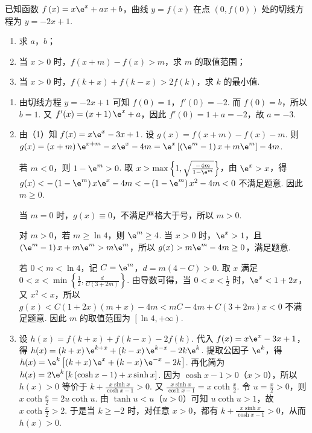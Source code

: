 \documentclass[UTF8,a4paper,oneside,11pt]{ctexbook}
\begin{document}
\begin{problem}
已知函数 \(f\left( x \right)=x\e^x+ax+b\)，曲线 \(y=f\left( x \right)\) 在点 \(\left( 0,f\left( 0 \right) \right)\) 处的切线方程为 \(y=-2x+1\).

\begin{enumerate}
\item 求 \(a\)，\(b\)；
\item 当 \(x>0\) 时，\(f\left( x+m \right)-f\left( x \right)>m\)，求 \(m\) 的取值范围；
\item 当 \(x>0\) 时，\(f\left( k+x \right)+f\left( k-x \right)>2f\left( k \right)\)，求 \(k\) 的最小值.
\end{enumerate}
\end{problem}

\begin{solution}
\begin{enumerate}
\item 由切线方程 \(y=-2x+1\) 可知 \(f(0)=1\)，\(f'(0)=-2\). 而 \(f(0)=b\)，所以 \(b=1\).
又 \(f'(x)=\left( x+1 \right)\e^x+a\)，因此 \(f'(0)=1+a=-2\)，故 \(a=-3\).

\item 由（1）知 \(f(x)=x\e^x-3x+1\). 设 \(g(x)=f\left( x+m \right)-f(x)-m\). 则 \(g(x)=\left( x+m \right)\e^{x+m}-x\e^x-4m=\e^x\left[ \left( \e^m-1 \right)x+m\e^m \right]-4m\).

若 \(m<0\)，则 \(1-\e^m>0\). 取 \(x>\max\left\{1,\sqrt{\frac{-4m}{1-\e^m}}\right\}\)，由 \(\e^x>x\)，得
\(
g(x)<-\left( 1-\e^m \right)x\e^x-4m<-\left( 1-\e^m \right)x^2-4m<0
\)
不满足题意. 因此 \(m\ge 0\).

当 \(m=0\) 时，\(g(x)\equiv 0\)，不满足严格大于号，所以 \(m>0\).

对 \(m>0\)，若 \(m\ge \ln 4\)，则 \(\e^m\ge 4\). 当 \(x>0\) 时，\(\e^x>1\)，且 \(\left( \e^m-1 \right)x+m\e^m>m\e^m\)，所以 \(g(x)>m\e^m-4m\ge 0\)，满足题意.

若 \(0<m<\ln 4\)，记 \(C=\e^m\)，\(d=m\left( 4-C \right)>0\). 取 \(x\) 满足 \(0<x<\min\left\{\frac{1}{2},\frac{d}{C\left( 3+2m \right)}\right\}\). 由导数可得，当 \(0<x<\frac{1}{2}\) 时，\(\e^x<1+2x\)，又 \(x^2<x\)，所以
\(
g(x)<C\left( 1+2x \right)\left( m+x \right)-4m<mC-4m+C\left( 3+2m \right)x<0
\)
不满足题意. 因此 \(m\) 的取值范围为 \(\left[ \ln 4,+\infty \right)\).

\item 设 \(h(x)=f\left( k+x \right)+f\left( k-x \right)-2f(k)\). 代入 \(f(x)=x\e^x-3x+1\)，得 \(h(x)=\left( k+x \right)\e^{k+x}+\left( k-x \right)\e^{k-x}-2k\e^k\). 提取公因子 \(\e^k\)，得 \(h(x)=\e^k\left[ \left( k+x \right)\e^x+\left( k-x \right)\e^{-x}-2k \right]\). 再化简为 \(h(x)=2\e^k\left[ k\left( \cosh x-1 \right)+x\sinh x \right]\).
因为 \(\cosh x-1>0\)（\(x>0\)），所以 \(h(x)>0\) 等价于 \(k+\frac{x\sinh x}{\cosh x-1}>0\). 又 \(\frac{x\sinh x}{\cosh x-1}=x\coth \frac{x}{2}\). 令 \(u=\frac{x}{2}>0\)，则 \(x\coth \frac{x}{2}=2u\coth u\). 由 \(\tanh u<u\)（\(u>0\)）可知 \(u\coth u>1\)，故 \(x\coth \frac{x}{2}>2\). 于是当 \(k\ge -2\) 时，对任意 \(x>0\)，都有 \(k+\frac{x\sinh x}{\cosh x-1}>0\)，从而 \(h(x)>0\).


\end{enumerate}
\end{solution}
\end{document}
